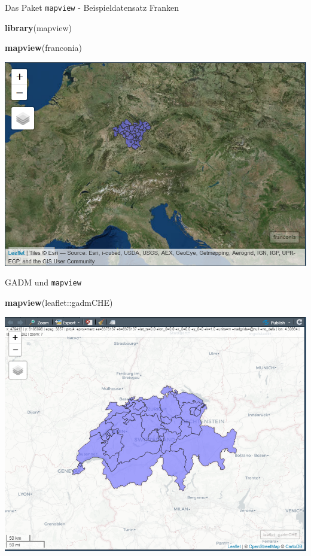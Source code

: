 \documentclass[ignorenonframetext,]{beamer}
\newenvironment{Shaded}{\begin{snugshade}}{\end{snugshade}}
\newcommand{\KeywordTok}[1]{\textcolor[rgb]{0.26,0.66,0.93}{\textbf{#1}}}
\newcommand{\NormalTok}[1]{\textcolor[rgb]{0.74,0.68,0.62}{#1}}
\newcommand{\OperatorTok}[1]{\textcolor[rgb]{0.74,0.68,0.62}{#1}}
\begin{document}
\begin{frame}[fragile]{Das Paket \texttt{mapview} - Beispieldatensatz
Franken}
\protect\hypertarget{das-paket-mapview---beispieldatensatz-franken}{}

\begin{Shaded}
\begin{Highlighting}[]
\KeywordTok{library}\NormalTok{(mapview)}

\KeywordTok{mapview}\NormalTok{(franconia)}
\end{Highlighting}
\end{Shaded}

\includegraphics{figure/franconia.PNG}

\end{frame}

\begin{frame}[fragile]{GADM und \texttt{mapview}}
\protect\hypertarget{gadm-und-mapview}{}

\begin{Shaded}
\begin{Highlighting}[]
\KeywordTok{mapview}\NormalTok{(leaflet}\OperatorTok{::}\NormalTok{gadmCHE)}
\end{Highlighting}
\end{Shaded}

\includegraphics{figure/gadm_mapview.PNG}

\end{frame}
\end{document}
